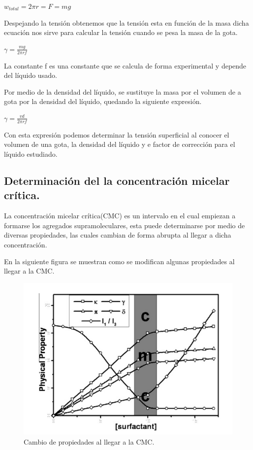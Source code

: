 \documentclass[10pt]{report}
\newcommand{\ec}[1]{\begin{center} $#1$ \end{center}}
\begin{document}
    \ec{w_{total} = 2\pi r = F = mg }

    Despejando la tensión obtenemos que la tensión esta en función de la masa dicha ecuación nos sirve para calcular la tensión cuando se pesa la masa de la gota.

    \ec{\gamma = \frac{mg}{2\pi rf}}

    La constante f es una constante que se calcula de forma experimental y depende del líquido usado.
    
    Por medio de la densidad del líquido, se sustituye la masa por el volumen de a gota por la densidad del líquido, quedando la siguiente expresión.

    \ec{\gamma = \frac{vd}{2\pi rf}}

    Con esta expresión podemos determinar la tensión superficial al conocer el volumen de una gota, la densidad del líquido y e factor de corrección para el líquido estudiado.

    \subsection*{Determinación del la concentración micelar crítica. \cite{art:arabian}}

    La concentración micelar crítica(CMC) es un intervalo en el cual empiezan a formarse los agregados supramoleculares, esta puede determinarse por medio de diversas propiedades, las cuales cambian de forma abrupta al llegar a dicha concentración.

    En la siguiente figura se muestran como se modifican algunas propiedades al llegar a la CMC.

    \begin{figure}[h]
        \centering
        \includegraphics[scale=0.5]{./cmc.jpg}
        \caption{Cambio de propiedades al llegar a la CMC.}
    \end{figure}
\end{document}
